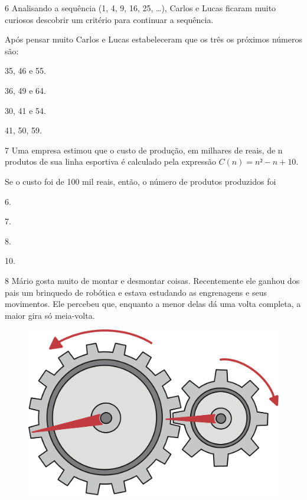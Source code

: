 \num{6} Analisando a sequência (1, 4, 9, 16, 25, \ldots{}), Carlos e Lucas 
ficaram muito curiosos descobrir um critério para continuar a sequência.

Após pensar muito Carlos e Lucas estabeleceram que os três os próximos
números são:

\begin{escolha}

  \item 35, 46 e 55.

  \item 36, 49 e 64.

  \item 30, 41 e 54.

  \item 41, 50, 59.

\end{escolha}

\pagebreak
\num{7} Uma empresa estimou que o custo de produção, em milhares de reais, de
n produtos de sua linha esportiva é calculado pela expressão $C(n)= n² - n + 10$.

Se o custo foi de 100 mil reais, então, o número de produtos produzidos foi

\begin{escolha}
  
  \item 6. 
  
  \item 7. 
  
  \item 8. 
  
  \item 10.

\end{escolha}


\num{8} Mário gosta muito de montar e desmontar coisas. Recentemente ele 
ganhou dos pais um brinquedo de robótica e estava estudando as engrenagens
e seus movimentos. Ele percebeu que, enquanto a menor delas dá uma volta
completa, a maior gira só meia-volta.

\begin{figure}[htpb!]
\centering
\includegraphics[width=.8\textwidth]{./ilustras-mat/Simulado_2-atividade_8.png}
\end{figure}

